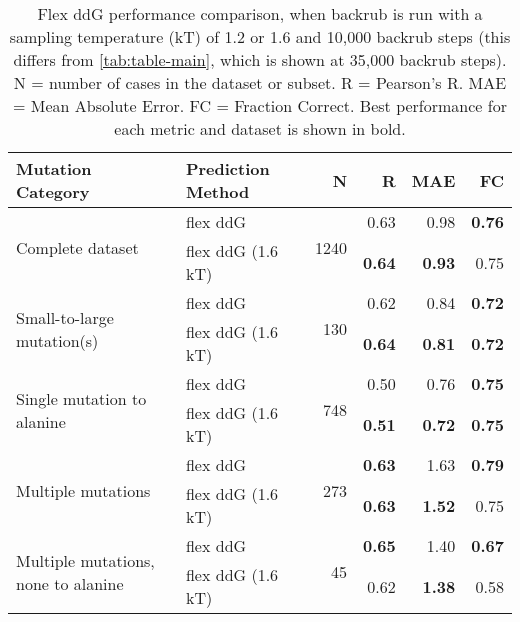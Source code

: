 \begin{table}
  \begin{tabular}{llrrrr}
\toprule
Mutation Category &  Prediction Method &     N &    R &  MAE &   FC \\
\midrule
 \multirow{ 2}{*}{Complete dataset} & flex ddG & \multirow{ 2}{*}{1240} & 0.63 & 0.98 & \textbf{0.76}  \\
 & flex ddG (1.6 kT) & & \textbf{0.64} & \textbf{0.93} & 0.75  \\
\hline
 \multirow{ 2}{*}{Small-to-large mutation(s)} & flex ddG & \multirow{ 2}{*}{130} & 0.62 & 0.84 & \textbf{0.72}  \\
 & flex ddG (1.6 kT) & & \textbf{0.64} & \textbf{0.81} & \textbf{0.72}  \\
\hline
 \multirow{ 2}{*}{Single mutation to alanine} & flex ddG & \multirow{ 2}{*}{748} & 0.50 & 0.76 & \textbf{0.75}  \\
 & flex ddG (1.6 kT) & & \textbf{0.51} & \textbf{0.72} & \textbf{0.75}  \\
\hline
 \multirow{ 2}{*}{Multiple mutations} & flex ddG & \multirow{ 2}{*}{273} & \textbf{0.63} & 1.63 & \textbf{0.79}  \\
 & flex ddG (1.6 kT) & & \textbf{0.63} & \textbf{1.52} & 0.75  \\
\hline
 \multirow{ 2}{*}{Multiple mutations, none to alanine} & flex ddG & \multirow{ 2}{*}{45} & \textbf{0.65} & 1.40 & \textbf{0.67}  \\
 & flex ddG (1.6 kT) & & 0.62 & \textbf{1.38} & 0.58  \\
\bottomrule
\end{tabular}
  \caption[Comparison of backrub temperature results]{
    Flex ddG performance comparison, when backrub is run with a sampling temperature (kT) of 1.2 or 1.6 and 10,000 backrub steps (this differs from \cref{tab:table-main}, which is shown at 35,000 backrub steps). N = number of cases in the dataset or subset. R = Pearson's R. MAE = Mean Absolute Error. FC = Fraction Correct. Best performance for each metric and dataset is shown in bold.
  } \label{tab:table-temperature}
\end{table}
